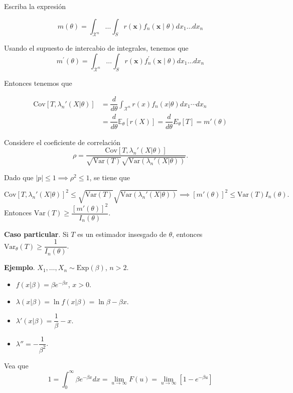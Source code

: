 \documentclass[
  12pt,
]{book}
\begin{document}
Escriba la expresión

\begin{equation*}
m(\theta)=\int_{\mathcal{X}^n} \ldots \int_{S} r(\boldsymbol{x}) f_{n}(\boldsymbol{x} \mid \theta) d x_{1} \ldots d x_{n}
\end{equation*}

Usando el supuesto de intercabio de integrales, tenemos que
\begin{equation*}
m^{\prime}(\theta)=\int_{\mathcal{X}^n} \ldots \int_{S} r(\boldsymbol{x}) f_{n}^{\prime}(\boldsymbol{x} \mid \theta) d x_{1} \ldots d x_{n}
\end{equation*}

Entonces tenemos que

\begin{align*}
\text{Cov}[T,\lambda_n'(X|\theta)] 
& =  \dfrac d{d\theta}\int_{\mathcal X^n}r(x)f_n(x|\theta)dx_1\cdots dx_n\\
& = \dfrac{d}{d\theta}\mathbb E_\theta[r(X)] = \dfrac{d}{d\theta}E_\theta[T] = m'(\theta)
\end{align*}

Considere el coeficiente de correlación
\[\rho = \dfrac{\text{Cov}[T,\lambda_n'(X|\theta)] }{\sqrt{\text{Var}(T)}\sqrt{\text{Var}(\lambda_n'(X|\theta))}}.\]

Dado que \(|p|\leq 1 \implies \rho^2 \leq 1\), se tiene que

\[\text{Cov}[T,\lambda_n'(X|\theta)]^2 \leq \sqrt{\text{Var}(T)}\sqrt{\text{Var}(\lambda_n'(X|\theta))} \implies [m'(\theta)]^2 \leq \text{Var}(T) I_n(\theta). \]
Entonces \(\text{Var}(T)\geq \dfrac{[m'(\theta)]^2 }{I_n(\theta)}\).

\textbf{Caso particular}. Si \(T\) es un estimador insesgado de \(\theta\), entonces \(\text{Var}_\theta(T)\geq \dfrac{1 }{I_n(\theta)}\).

\textbf{Ejemplo}. \(X_1,\dots, X_n \sim \text{Exp}(\beta)\), \(n>2\).

\begin{itemize}
\item
  \(f(x|\beta) = \beta e^{-\beta x}\), \(x>0\).
\item
  \(\lambda(x|\beta) = \ln f(x|\beta) = \ln \beta -\beta x\).
\item
  \(\lambda'(x|\beta) = \dfrac 1\beta -x.\)
\item
  \(\lambda'' = -\dfrac 1{\beta^2}\).
\end{itemize}

Vea que
\[1 = \int_{0}^\infty \beta e^{-\beta x}dx = \lim_{u\to \infty}F(u) = \lim_{u\to \infty}[1-e^{-\beta u}]\]
\end{document}
